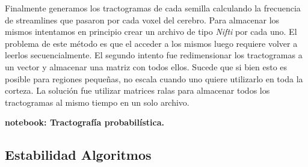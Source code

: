 Finalmente generamos los tractogramas de cada semilla calculando la frecuencia
de streamlines que pasaron por cada voxel del cerebro. Para almacenar los mismos
intentamos en principio crear un archivo de tipo \textit{Nifti} por cada uno.
El problema de este m\'etodo es que el acceder a los mismos luego requiere volver
a leerlos secuencialmente. El segundo intento fue redimensionar los tractogramas 
a un vector y almacenar una matriz con todos ellos. Sucede que si bien esto es
posible para regiones peque\~nas, no escala cuando uno quiere utilizarlo en toda
la corteza. La soluci\'on fue utilizar matrices ralas para almacenar todos los 
tractogramas al mismo tiempo en un solo archivo. 



\textbf{notebook: Tractograf\'ia probabil\'istica.}

\subsection{Estabilidad Algoritmos}


